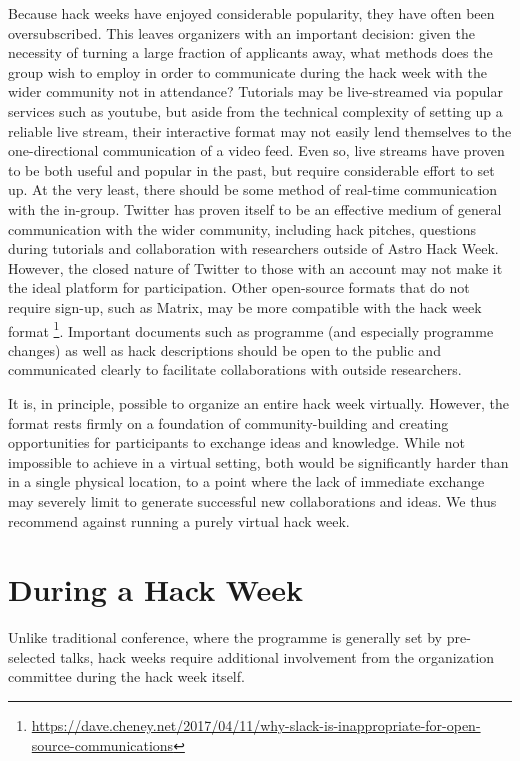 \documentclass{nature}
\begin{document}
Because hack weeks have enjoyed considerable popularity, they have often been oversubscribed. This leaves organizers with an important decision: given the necessity of turning a large fraction of applicants away, what methods does the group wish to employ in order to communicate during the hack week with the wider community not in attendance? Tutorials may be live-streamed via popular services such as youtube, but aside from the technical complexity of setting up a reliable live stream, their interactive format may not easily lend themselves to the one-directional communication of a video feed. Even so, live streams have proven to be both useful and popular in the past, but require considerable effort to set up. At the very least, there should be some method of real-time communication with the in-group. Twitter has proven itself to be an effective medium of general communication with the wider community, including hack pitches, questions during tutorials and collaboration with researchers outside of Astro Hack Week. However, the closed nature of Twitter to those with an account may not make it the ideal platform for participation. Other open-source formats that do not require sign-up, such as Matrix, may be more compatible with the hack week format \footnote{\url{https://dave.cheney.net/2017/04/11/why-slack-is-inappropriate-for-open-source-communications}}. Important documents such as programme (and especially programme changes) as well as hack descriptions should be open to the public and communicated clearly to facilitate collaborations with outside researchers.

It is, in principle, possible to organize an entire hack week virtually. However, the format rests firmly on a foundation of community-building and creating opportunities for participants to exchange ideas and knowledge. While not impossible to achieve in a virtual setting, both would be significantly harder than in a single physical location, to a point where the lack of immediate exchange may severely limit to generate successful new collaborations and ideas. We thus recommend against running a purely virtual hack week.

\section{During a Hack Week}

Unlike traditional conference, where the programme is generally set by pre-selected talks, hack weeks require additional involvement from the organization committee during the hack week itself.
\end{document}
